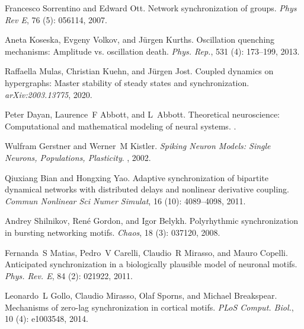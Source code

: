 Francesco Sorrentino and Edward Ott.
\newblock Network synchronization of groups.
\newblock \emph{Phys Rev E}, 76 (5): 056114, 2007.

Aneta Koseska, Evgeny Volkov, and J{\"u}rgen Kurths.
\newblock Oscillation quenching mechanisms: {{Amplitude}} vs. oscillation
death.
\newblock \emph{Phys. Rep.}, 531 (4): 173--199, 2013.

Raffaella Mulas, Christian Kuehn, and J{\"u}rgen Jost.
\newblock Coupled dynamics on hypergraphs: {{Master}} stability of steady
states and synchronization.
\newblock \emph{arXiv:2003.13775}, 2020.

Peter Dayan, Laurence~F Abbott, and L~Abbott.
\newblock Theoretical neuroscience: Computational and mathematical modeling of
neural systems.
.

Wulfram Gerstner and Werner~M Kistler.
\newblock \emph{Spiking Neuron Models: {{Single}} Neurons, Populations,
    Plasticity}.
, 2002.

Qiuxiang Bian and Hongxing Yao.
\newblock Adaptive synchronization of bipartite dynamical networks with
distributed delays and nonlinear derivative coupling.
\newblock \emph{Commun Nonlinear Sci Numer Simulat}, 16 (10):
4089--4098, 2011.

Andrey Shilnikov, Ren{\'e} Gordon, and Igor Belykh.
\newblock Polyrhythmic synchronization in bursting networking motifs.
\newblock \emph{Chaos}, 18 (3): 037120, 2008.

Fernanda~S Matias, Pedro~V Carelli, Claudio~R Mirasso, and Mauro Copelli.
\newblock Anticipated synchronization in a biologically plausible model of
neuronal motifs.
\newblock \emph{Phys. Rev. E}, 84 (2): 021922, 2011.

Leonardo~L Gollo, Claudio Mirasso, Olaf Sporns, and Michael Breakspear.
\newblock Mechanisms of zero-lag synchronization in cortical motifs.
\newblock \emph{PLoS Comput. Biol.}, 10 (4): e1003548, 2014.

